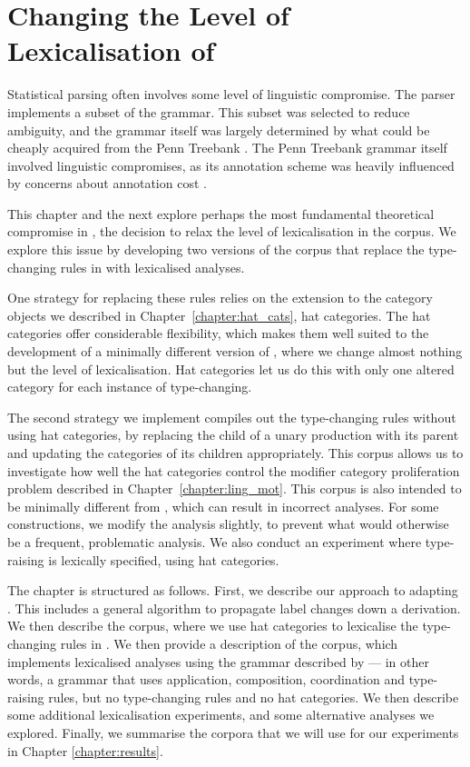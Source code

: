 
\chapter{Changing the Level of Lexicalisation of \ccgbank}

\label{chapter:hat_corpus}

Statistical parsing often involves some level of linguistic compromise. The
\candc parser \citep{clark:cl07} implements a subset of the \ccgbank grammar.
This subset was selected to reduce ambiguity, and the \ccgbank grammar
itself was largely determined by what could be cheaply acquired from the Penn
Treebank \citep{marcus:93}. The Penn Treebank grammar itself involved linguistic
compromises, as its annotation scheme was heavily influenced by concerns about
annotation cost \citep{bies:95}.

This chapter and the next explore perhaps the most fundamental theoretical
compromise in \ccgbank, the decision to relax the level of lexicalisation in the
corpus. We explore this issue by developing two versions of the corpus that
replace the type-changing rules in \ccgbank with lexicalised analyses.

One strategy for replacing these rules relies on the extension to the category
objects we described in Chapter~\ref{chapter:hat_cats}, hat categories. The hat
categories offer considerable flexibility, which makes them well suited to the
development of a minimally different version of \ccgbank, where we change almost
nothing but the level of lexicalisation. Hat categories let us do this with only
one altered category for each instance of type-changing.

The second strategy we implement compiles out the type-changing rules without
using hat categories, by replacing the child of a unary production with its
parent and updating the categories of its children appropriately. This corpus
allows us to investigate how well the hat categories control the modifier
category proliferation problem described in Chapter~\ref{chapter:ling_mot}. This
corpus is also intended to be minimally different from \ccgbank, which can
result in incorrect analyses. For some constructions, we modify the analysis
slightly, to prevent what would otherwise be a frequent, problematic analysis.
We also conduct an experiment where type-raising is lexically specified, using
hat categories.

The chapter is structured as follows.
First, we describe our approach to adapting \ccgbank. This includes a general
algorithm to propagate label changes down a \ccg derivation.
We then describe the \hatsys corpus, where we use hat categories to lexicalise
the type-changing rules in \ccgbank. We then provide a description of the
\nounary corpus, which implements lexicalised analyses using the \ccg grammar
described by \citet{steedman:00} --- in other words, a \ccg grammar that uses
application, composition, coordination and type-raising rules, but no
type-changing rules and no hat categories. We then describe some additional
lexicalisation experiments, and some alternative analyses we explored. Finally,
we summarise the corpora that we will use for our experiments in Chapter
\ref{chapter:results}.

